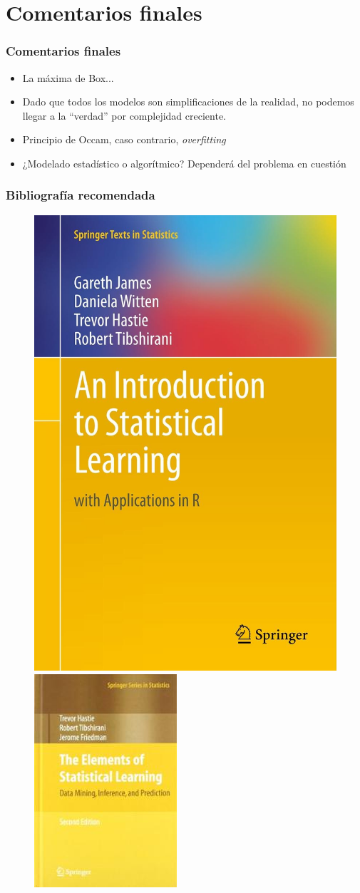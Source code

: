 \documentclass{beamer}
\begin{document}
\section{Comentarios finales}
\begin{frame}
	\frametitle{Comentarios finales}
	\begin{itemize}
		\item{La máxima de Box...}
		\item{Dado que todos los modelos son simplificaciones de la realidad, no podemos llegar a la ``verdad'' por complejidad creciente.}
		\item{Principio de Occam, caso contrario, \emph{overfitting}}
		\item{¿Modelado estadístico o algorítmico? Dependerá del problema en cuestión}
	\end{itemize}
\end{frame}

\begin{frame}
	\frametitle{Bibliografía recomendada}
	\begin{figure}
		\centering
		\includegraphics[width=0.33\linewidth, height=0.7\textheight]{img/ISL} \includegraphics[width=0.34\linewidth, height=0.7\textheight]{img/ESL}
	\end{figure}
\end{frame}
\end{document}
